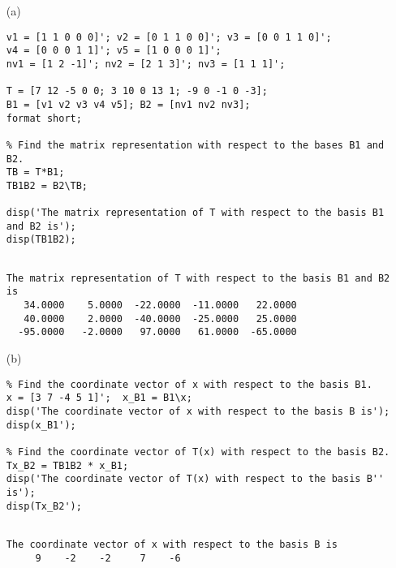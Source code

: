 \begin{sol}

\vspace{1mm}

\begin{enumerate}

\vspace{1mm}
\verb""
\item[(a)]
\begin{verbatim}
v1 = [1 1 0 0 0]'; v2 = [0 1 1 0 0]'; v3 = [0 0 1 1 0]';
v4 = [0 0 0 1 1]'; v5 = [1 0 0 0 1]';
nv1 = [1 2 -1]'; nv2 = [2 1 3]'; nv3 = [1 1 1]';

T = [7 12 -5 0 0; 3 10 0 13 1; -9 0 -1 0 -3];
B1 = [v1 v2 v3 v4 v5]; B2 = [nv1 nv2 nv3];
format short;

% Find the matrix representation with respect to the bases B1 and B2.
TB = T*B1;
TB1B2 = B2\TB;

disp('The matrix representation of T with respect to the basis B1 and B2 is');
disp(TB1B2);
\end{verbatim}



\begin{outputs}
\begin{verbatim}

The matrix representation of T with respect to the basis B1 and B2 is
   34.0000    5.0000  -22.0000  -11.0000   22.0000
   40.0000    2.0000  -40.0000  -25.0000   25.0000
  -95.0000   -2.0000   97.0000   61.0000  -65.0000
\end{verbatim}

\end{outputs}


\item[(b)]
\begin{verbatim}
% Find the coordinate vector of x with respect to the basis B1.
x = [3 7 -4 5 1]';  x_B1 = B1\x; 
disp('The coordinate vector of x with respect to the basis B is');
disp(x_B1');

% Find the coordinate vector of T(x) with respect to the basis B2.
Tx_B2 = TB1B2 * x_B1;
disp('The coordinate vector of T(x) with respect to the basis B'' is');
disp(Tx_B2');
\end{verbatim}



\begin{outputs}
\begin{verbatim}

The coordinate vector of x with respect to the basis B is
     9    -2    -2     7    -6


\end{verbatim}
\end{outputs}
\end{enumerate}
\end{sol}
